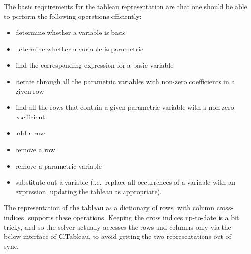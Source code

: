 \documentclass{article}
\begin{document}
The basic requirements for the tableau representation are that one should
be able to perform the following operations efficiently:

\begin{itemize}

\item determine whether a variable is basic

\item determine whether a variable is parametric

\item find the corresponding expression for a basic variable

\item iterate through all the parametric variables with non-zero
coefficients in a given row

\item find all the rows that contain a given parametric variable with a
non-zero coefficient

\item add a row

\item remove a row

\item remove a parametric variable

\item substitute out a variable (i.e.\ replace all occurrences of a
variable with an expression, updating the tableau as appropriate).

\end{itemize}

The representation of the tableau as a dictionary of rows, with column
cross-indices, supports these operations.  Keeping the cross indices
up-to-date is a bit tricky, and so the solver actually accesses the rows
and columns only via the below interface of {\sf ClTableau}, to avoid
getting the two representations out of sync.
\end{document}
